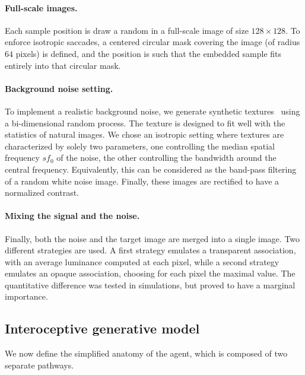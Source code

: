 \paragraph{Full-scale images.} Each sample position is draw a random in a full-scale image of size $128\times 128$. To enforce isotropic saccades, a centered circular mask covering the image (of radius $64$ pixels) is defined, and the position is such that the embedded sample fits entirely into that circular mask.

\paragraph{Background noise setting. } To implement a realistic background noise, we generate synthetic textures~\citep{Sanz12} using a bi-dimensional random process. %
The texture is designed to fit well with the statistics of natural images. We chose an isotropic setting where textures are characterized by solely two parameters, one controlling the median spatial frequency $sf_0$ of the noise, the other controlling the bandwidth around the central frequency. Equivalently, this can be considered as the band-pass filtering of a random white noise image. Finally, these images are rectified to have a normalized contrast.

\paragraph{Mixing the signal and the noise. } Finally, both the noise and the target image are merged into a single image. Two different strategies are used. A first strategy emulates a transparent association, with an average luminance computed at each pixel, while a second strategy emulates an opaque association, choosing for each pixel the maximal value. The quantitative difference was tested in simulations, but proved to have a marginal importance.
%
\subsection{Interoceptive generative model}
%
We  now define the simplified anatomy of the agent, which is composed of two separate pathways.

